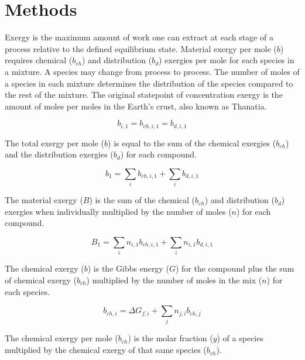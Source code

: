 \documentclass[journal,article,submit,pdftex,moreauthors]{Definitions/mdpi}
\begin{document}
\section{Methods}

Exergy is the maximum amount of work one can extract
at each stage of a process relative to the defined equilibrium state.
Material exergy per mole ($b$) requires chemical ($b_{ch}$) and distribution ($b_d$) exergies per mole
for each species in a mixture.
A species may change from process to process.
The number of moles of a species in each mixture
determines the distribution of the species
compared to the rest of the mixture.
The original statepoint of concentration exergy is the amount of moles per moles
in the Earth's crust, also known as Thanatia.

\begin{equation}\label{eq:simplified_material_exergy_definition}
  b_{i,1} = b_{ch,i,1} = b_{d,i,1}
\end{equation}

The total exergy per mole ($b$) is equal to the sum of the chemical exergies ($b_{ch}$)
and the distribution exergies ($b_d$) for each compound.

\begin{equation}\label{eq:specific_molar_intensive_exergy_definition}
  b_{1} = \sum_{i}{b_{ch,i,1}} + \sum_{i}{b_{d,i,1}}
\end{equation}

The material exergy ($B$) is the sum of the chemical ($b_{ch}$) and distribution ($b_d$) exergies when individually multiplied by the number of moles ($n$) for each compound.

\begin{equation}\label{eq:specific_exergy_definition}
  B_{1} = \sum_{i}{n_{i,1}b_{ch,i,1}} + \sum_{i}{n_{i,1}b_{d,i,1}}
\end{equation}

The chemical exergy ($b$) is the Gibbs energy ($G$) for the compound
plus the sum of chemical exergy ($b_{ch}$) multiplied by the number of moles
in the mix ($n$) for each species. %

\begin{equation}\label{eq:specific_chemical_exergy_definition}
  b_{ch,i} = \Delta{G_{f,i}} + \sum_{j}{n_{j,i}b_{ch,j}}
\end{equation}

The chemical exergy per mole ($b_{ch}$) is the molar fraction ($y$) of a species multiplied by the chemical exergy of that same species ($b_{ch}$).
\end{document}
